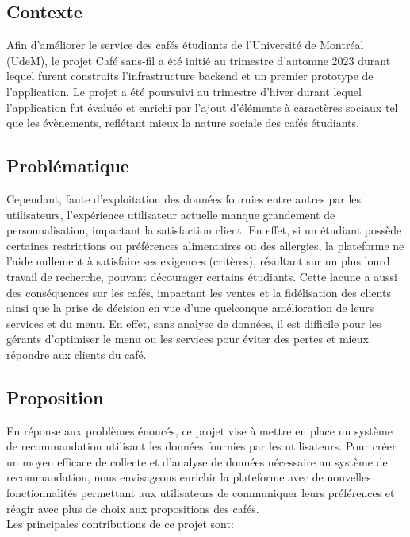 \documentclass[11pt]{article}
\begin{document}
\subsection{Contexte}
Afin d'améliorer le service des cafés étudiants de l'Université de Montréal (UdeM), le projet Café sans-fil a été initié au trimestre d'automne 2023 durant lequel furent construits l'infrastructure backend et un premier prototype de l'application. Le projet a été poursuivi au trimestre d'hiver durant lequel l'application fut évaluée et enrichi par l'ajout d'éléments à caractères sociaux tel que les évènements, reflétant mieux la nature sociale des cafés étudiants. \\

\subsection{Problématique}
Cependant, faute d'exploitation des données fournies entre autres par les utilisateurs, l'expérience utilisateur actuelle manque grandement de personnalisation, impactant la satisfaction client. En effet, si un étudiant possède certaines restrictions ou préférences alimentaires ou des allergies, la plateforme ne l'aide nullement à satisfaire ses exigences (critères), résultant sur un plus lourd travail de recherche, pouvant décourager certains étudiants.
Cette lacune a aussi des conséquences sur les cafés, impactant les ventes et la fidélisation des clients ainsi que la prise de décision en vue d'une quelconque amélioration de leurs services et du menu. En effet, sans analyse de données, il est difficile pour les gérants d'optimiser le menu ou les services pour éviter des pertes et mieux répondre aux clients du café.\\

\subsection{Proposition}
En réponse aux problèmes énoncés, ce projet vise à mettre en place un système de recommandation utilisant les données fournies par les utilisateurs. Pour créer un moyen efficace de collecte et d'analyse de données nécessaire au système de recommandation, nous envisageons enrichir la plateforme avec de nouvelles fonctionnalités permettant aux utilisateurs de communiquer leurs préférences et réagir avec plus de choix aux propositions des cafés.\\

Les principales contributions de ce projet sont:
\end{document}
